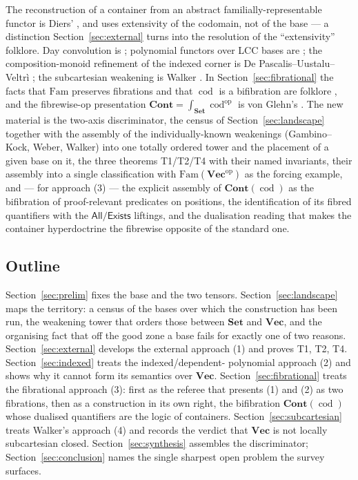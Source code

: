 \documentclass[11pt]{amsart}
\theoremstyle{plain}
\theoremstyle{definition}
\theoremstyle{remark}
\newcommand{\Set}{\mathbf{Set}}
\newcommand{\Vect}{\mathbf{Vec}}
\newcommand{\Fam}{\mathrm{Fam}}
\newcommand{\Cont}{\mathbf{Cont}}
\newcommand{\op}{\mathrm{op}}
\DeclareMathOperator{\cod}{cod}
\newcommand{\Exists}{\mathsf{Exists}}
\newcommand{\All}{\mathsf{All}}
\begin{document}
The reconstruction of a container from an abstract familially-representable functor is Diers'
\cite{Diers}, and uses extensivity of the codomain, not of the base --- a distinction Section~\ref{sec:external}
turns into the resolution of the ``extensivity'' folklore. Day convolution is \cite{Day}; polynomial
functors over LCC bases are \cite{GambinoKock}; the composition-monoid refinement of the indexed
corner is De Pascalis--Uustalu--Veltr\`i \cite{DPUV}; the subcartesian weakening is Walker
\cite{Walker}. In Section~\ref{sec:fibrational} the facts that $\Fam$ preserves fibrations and that
$\cod$ is a bifibration are folklore \cite{Hermida,Jacobs}, and the fibrewise-op presentation
$\Cont=\int_{\Set}\cod^\op$ is von Glehn's \cite{vonGlehn}. The new material is the two-axis
discriminator, the census of Section~\ref{sec:landscape} together with the assembly of the
individually-known weakenings (Gambino--Kock, Weber, Walker) into one totally ordered tower and the
placement of a given base on it, the three theorems T1/T2/T4 with their named invariants, their
assembly into a single
classification with $\Fam(\Vect^\op)$ as the forcing example, and --- for approach (3) --- the
explicit assembly of $\Cont(\cod)$ as the bifibration of proof-relevant predicates on positions, the
identification of its fibred quantifiers with the $\All/\Exists$ liftings, and the dualisation reading
that makes the container hyperdoctrine the fibrewise opposite of the standard one.

\subsection{Outline}
Section~\ref{sec:prelim} fixes the base and the two tensors. Section~\ref{sec:landscape} maps the
territory: a census of the bases over which the construction has been run, the weakening tower that
orders those between $\Set$ and $\Vect$, and the organising fact that off the good zone a base fails
for exactly one of two reasons. Section~\ref{sec:external} develops the
external approach (1) and proves T1, T2, T4. Section~\ref{sec:indexed} treats the indexed/dependent-
polynomial approach (2) and shows why it cannot form its semantics over $\Vect$.
Section~\ref{sec:fibrational} treats the fibrational approach (3): first as the referee that presents
(1) and (2) as two fibrations, then as a construction in its own right, the bifibration
$\Cont(\cod)$ whose dualised quantifiers are the logic of containers. Section~\ref{sec:subcartesian} treats Walker's approach (4) and records
the verdict that $\Vect$ is not locally subcartesian closed. Section~\ref{sec:synthesis} assembles
the discriminator; Section~\ref{sec:conclusion} names the single sharpest open problem the survey
surfaces.
\end{document}
